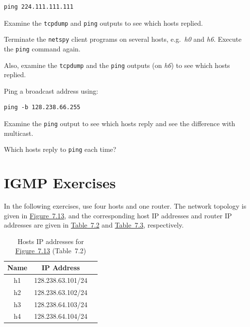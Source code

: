 \documentclass{../UTNetLab}
\begin{document}
\begin{lstlisting}
ping 224.111.111.111
    \end{lstlisting}
Examine the \lstinline{tcpdump} and \lstinline{ping} outputs to see which hosts replied.

Terminate the \lstinline{netspy} client programs on several hosts, e.g.\ \textit{h0} and \textit{h6}.
Execute the \lstinline{ping} command again.

Also, examine the \lstinline{tcpdump} and the \lstinline{ping} outputs (on \textit{h6}) to see which hosts replied.

Ping a broadcast address using:

\begin{lstlisting}
ping -b 128.238.66.255
    \end{lstlisting}
Examine the \lstinline{ping} output to see which hosts reply and see the difference with multicast.


\begin{report}
    \item Which hosts reply to \lstinline{ping} each time?
\end{report}

\part{IGMP Exercises}\label{sec:igmp}
In the following exercises, use four hosts and one router.
The network topology is given in \hyperref[fig:7.13]{Figure~7.13}, and the corresponding host IP addresses and router IP addresses are given in \hyperref[tab:7.2]{Table~7.2} and \hyperref[tab:7.3]{Table~7.3}, respectively.

\begin{table}[H]
    \caption{Hosts IP addresses for \hyperref[fig:7.13]{Figure~7.13} (Table~7.2)}
    \label{tab:7.2}
    \centering
    \begin{tabular}{ *3c }
        \hline \hline
        Name & IP Address        \\
        \hline
        h1   & 128.238.63.101/24 \\
        h2   & 128.238.63.102/24 \\
        h3   & 128.238.64.103/24 \\
        h4   & 128.238.64.104/24 \\
        \hline \hline
    \end{tabular}
\end{table}
\end{document}
